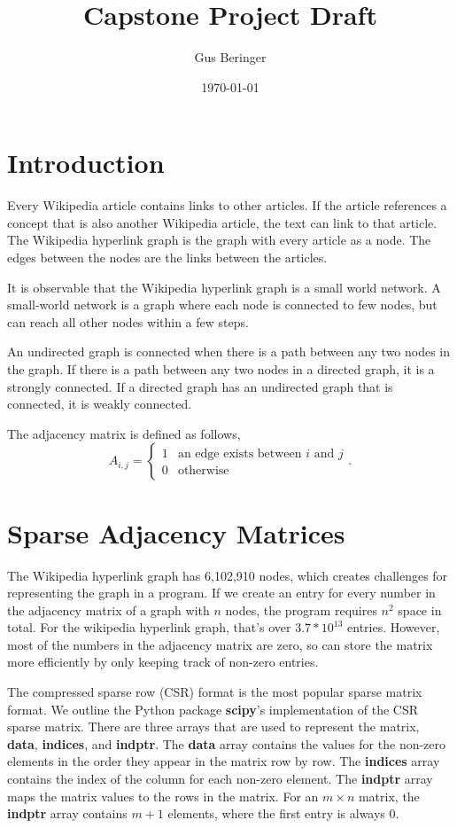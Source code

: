 \documentclass{article}
\author{Gus Beringer}
\title{Capstone Project Draft}
\date{\today}
\begin{document}
\maketitle
\tableofcontents

\section{Introduction}

Every Wikipedia article contains links to other articles. If the article references a concept that is also another Wikipedia article, the text can link to that article.
The Wikipedia hyperlink graph is the graph with every article as a node. The edges between the nodes are the links between the articles.

It is observable that the Wikipedia hyperlink graph is a small world network.
A small-world network is a graph where each node is connected to few nodes, but can reach all other nodes within a few steps.

An undirected graph is connected when there is a path between any two nodes in the graph.
If there is a path between any two nodes in a directed graph, it is a strongly connected.
If a directed graph has an undirected graph that is connected, it is weakly connected.

The adjacency matrix is defined as follows,
\begin{equation*}
    A_{i, j} = \begin{cases}
        1 & \textrm{an edge exists between $i$ and $j$} \\
        0 & \textrm{otherwise}
    \end{cases}.
\end{equation*}


\section{Sparse Adjacency Matrices}

The Wikipedia hyperlink graph has 6,102,910 nodes, which creates challenges for representing the graph in a program.
If we create an entry for every number in the adjacency matrix of a graph with $n$ nodes, the program requires $n^2$ space in total.  
For the wikipedia hyperlink graph, that's over $3.7 * 10^{13}$ entries.
However, most of the numbers in the adjacency matrix are zero, so can store the matrix more efficiently by only keeping track of non-zero entries.

The compressed sparse row (CSR) format is the most popular sparse matrix format.
We outline the Python package \textbf{scipy}'s implementation of the CSR sparse matrix.
There are three arrays that are used to represent the matrix, \textbf{data}, \textbf{indices}, and \textbf{indptr}.
\autocite{scipy_doc}
The \textbf{data} array contains the values for the non-zero elements in the order they appear in the matrix row by row.
The \textbf{indices} array contains the index of the column for each non-zero element.
The \textbf{indptr} array maps the matrix values to the rows in the matrix.
For an $m\times n$ matrix, the \textbf{indptr} array contains $m+1$ elements, where the first entry is always 0.
\end{document}
